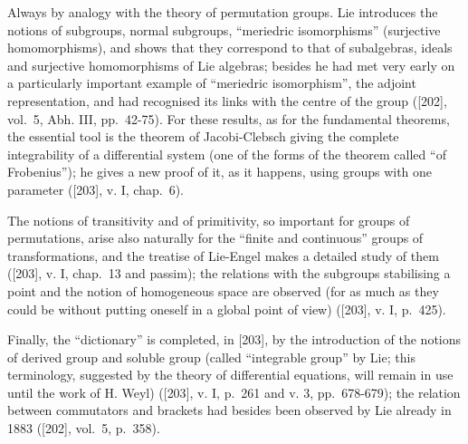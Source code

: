 Always by analogy with the theory of permutation groups. Lie introduces the notions of subgroups, normal subgroups, ``meriedric isomorphisms'' (surjective homomorphisms), and shows that they correspond to that of subalgebras, ideals and surjective homomorphisms of Lie algebras; besides he had met very early on a particularly important example of ``meriedric isomorphism'', the adjoint representation, and had recognised its links with the centre of the group ({[}202{]}, vol.~5, Abh. III, pp.~42-75). For these results, as for the fundamental theorems, the essential tool is the theorem of Jacobi-Clebsch giving the complete integrability of a differential system (one of the forms of the theorem called ``of Frobenius''); he gives a new proof of it, as it happens, using groups with one parameter ({[}203{]}, v. I, chap.~6).

The notions of transitivity and of primitivity, so important for groups of permutations, arise also naturally for the ``finite and continuous'' groups of transformations, and the treatise of Lie-Engel makes a detailed study of them ({[}203{]}, v. I, chap.~13 and passim); the relations with the subgroups stabilising a point and the notion of homogeneous space are observed (for as much as they could be without putting oneself in a global point of view) ({[}203{]}, v. I, p.~425).

Finally, the ``dictionary'' is completed, in {[}203{]}, by the introduction of the notions of derived group and soluble group (called ``integrable group'' by Lie; this terminology, suggested by the theory of differential equations, will remain in use until the work of H. Weyl) ({[}203{]}, v. I, p.~261 and v. 3, pp.~678-679); the relation between commutators and brackets had besides been observed by Lie already in 1883 ({[}202{]}, vol.~5, p.~358).

